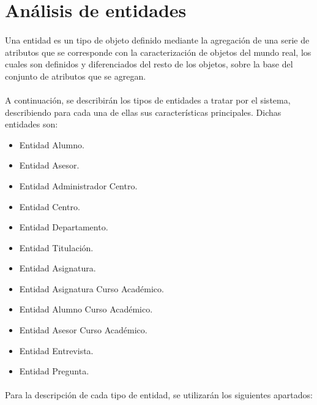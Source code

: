 \section{Análisis de entidades}

   \paragraph{}Una entidad es un tipo de objeto definido mediante la agregación
   de una serie de atributos que se corresponde con la caracterización de
   objetos del mundo real, los cuales son definidos y diferenciados del resto de
   los objetos, sobre la base del conjunto de atributos que se agregan.

   \paragraph{}A continuación, se describirán los tipos de entidades a tratar
   por el sistema, describiendo para cada una de ellas sus características
   principales. Dichas entidades son:

   \begin{itemize}
    \item Entidad Alumno.
    \item Entidad Asesor.
    \item Entidad Administrador Centro.
    \item Entidad Centro.
    \item Entidad Departamento.
    \item Entidad Titulación.
    \item Entidad Asignatura.
    \item Entidad Asignatura Curso Académico.
    \item Entidad Alumno Curso Académico.
    \item Entidad Asesor Curso Académico.
    \item Entidad Entrevista.
    \item Entidad Pregunta.
   \end{itemize}

   \paragraph{}Para la descripción de cada tipo de entidad, se utilizarán los
   siguientes apartados:

